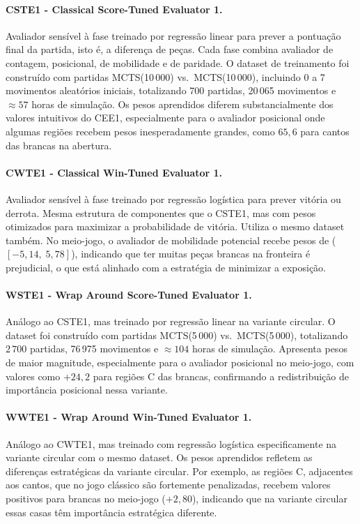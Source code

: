 \documentclass[12pt]{article}
\begin{document}
\paragraph{CSTE1 - Classical Score-Tuned Evaluator 1.}
Avaliador sensível à fase treinado por regressão linear para prever a pontuação
final da partida, isto é, a diferença de peças. Cada fase combina %
avaliador de contagem, posicional, de mobilidade e de paridade.
O dataset de treinamento foi construído com partidas MCTS(10\,000) vs.\ MCTS(10\,000),
incluindo 0 a 7 movimentos aleatórios iniciais, totalizando 700 partidas, 20\,065
movimentos e ${\approx}57$ horas de simulação. Os pesos aprendidos diferem
substancialmente dos valores intuitivos do CEE1, especialmente para o 
avaliador posicional
onde algumas regiões recebem pesos inesperadamente grandes, como $65{,}6$ para cantos das
brancas na abertura.
 
\paragraph{CWTE1 - Classical Win-Tuned Evaluator 1.}
Avaliador sensível à fase treinado por regressão logística para prever vitória ou
derrota. Mesma estrutura de componentes que o CSTE1, mas com pesos otimizados para maximizar a probabilidade de vitória. Utiliza o mesmo
dataset também. No meio-jogo, o
avaliador de mobilidade potencial recebe pesos de
($[-5{,}14,\; 5{,}78]$), indicando que ter muitas peças brancas na fronteira é prejudicial,
o que está alinhado com a estratégia de minimizar a exposição.
 

 
\paragraph{WSTE1 - Wrap Around Score-Tuned Evaluator 1.}
Análogo ao CSTE1, mas treinado por regressão linear na variante circular. O dataset foi construído com partidas MCTS(5\,000) vs.\ MCTS(5\,000), totalizando
$2\,700$ partidas, 76\,975 movimentos e ${\approx}104$ horas de simulação. Apresenta pesos de maior magnitude, especialmente para o 
avaliador posicional
no meio-jogo, com valores como $+24{,}2$ para regiões C das brancas, confirmando a
redistribuição de importância posicional nessa variante.

\paragraph{WWTE1 - Wrap Around Win-Tuned Evaluator 1.}
Análogo ao CWTE1, mas treinado com regressão logística especificamente na variante
circular com o mesmo dataset. Os pesos
aprendidos refletem as diferenças estratégicas da variante circular. Por exemplo, as regiões
C, adjacentes aos cantos, que no jogo clássico são fortemente penalizadas, recebem valores
positivos para brancas no meio-jogo ($+2{,}80$), indicando que na variante circular essas
casas têm importância estratégica diferente.
 
\end{document}
